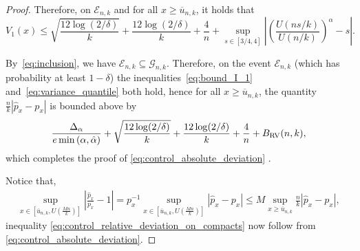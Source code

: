\documentclass{article}
\numberwithin{equation}{section}
\begin{document}
\begin{proof}
    Therefore, on \(\mathcal{E}_{n,k}\) and for all \(x\geq
    \overline{u}_{n,k}\), it holds that
    \begin{equation}\label{eq:variance_quantile}
        V_{1}(x) \leq \sqrt{\frac{12\log(2/\delta)}{k}} +
        \frac{12\log(2/\delta)}{k} + \frac{4}{n} +
        \sup_{s\in[3/4,4]}{\left|\left(\frac{U(ns/k)}{U(n/k)}\right)^{\alpha}-s\right|}.
    \end{equation}

    By~\eqref{eq:inclusion}, we have
    \(\mathcal{E}_{n,k}\subseteq\mathcal{G}_{n,k}\).
    Therefore, on the event \(\mathcal{E}_{n,k}\) (which has
    probability at least \(1-\delta\)) the
    inequalities~\eqref{eq:bound_I_1}
    and~\eqref{eq:variance_quantile} both hold, hence
    for all \(x \geq \overline{u}_{n,k}\), the quantity
    \(\frac{n}{k}|\widehat p_{x} - p_{x}|\)
    is bounded above by
    \begin{equation*}
        \frac{\Delta_{\alpha}}{e \min{(\alpha,
        \hat{\alpha})}} + \sqrt{\frac{12\log(2/\delta)}{k}} +
        \frac{12\log(2/\delta)}{k} + \frac{4}{n} +
        B_\textnormal{RV}(n,k),
    \end{equation*}
    which completes the proof of \eqref{eq:control_absolute_deviation} .

    Notice that,
    \begin{align*}
        \sup_{x\in [\overline{u}_{n,k}, U(\frac{Mn}{k})]}
        \left|\frac{\widehat{p}_{x}}{p_x}-1\right| =
        p_x^{-1}\sup_{x\in [\overline{u}_{n,k},
        U(\frac{Mn}{k})]}\left|\widehat{p}_{x}-p_x\right|\leq
        M\sup_{x\geq
        \overline{u}_{n,k}}\frac{n}{k}\left|\widehat{p}_{x}-p_x\right|,
    \end{align*}
    inequality \eqref{eq:control_relative_deviation_on_compacts}
    now follow from \eqref{eq:control_absolute_deviation}.


\end{proof}
\end{document}
